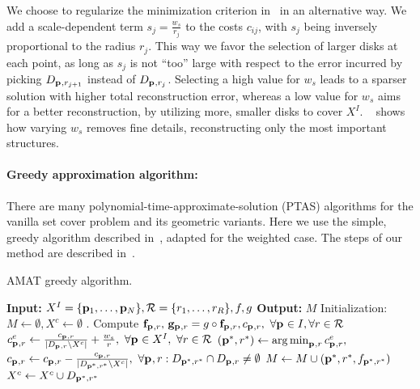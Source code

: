 \documentclass[10pt,twocolumn,letterpaper]{article}
\begin{document}
We choose to regularize the minimization criterion in~ in an alternative way. 
We add a scale-dependent term $s_j = \frac{w_s}{r_j}$ to the costs $c_{ij}$, with $s_j$ 
being inversely proportional to the radius $r_j$.
This way we favor the selection of larger disks at each point, as long as $s_j$ is not ``too'' large
with respect to the error incurred by picking $D_{\mathbf{p}_{},r_{j+1}}$ instead of $D_{\mathbf{p}_{},r_j}$.
Selecting a high value for $w_s$ leads to a sparser solution with higher total reconstruction error,
whereas a low value for $w_s$ aims for a better reconstruction, by utilizing more, smaller disks
to cover $X^I$.
~ shows how varying $w_s$ removes fine details, reconstructing only the most important structures.

\paragraph{Greedy approximation algorithm:}
There are many polynomial-time-approximate-solution (PTAS) algorithms for the vanilla set cover problem
and its geometric variants.
Here we use the simple, greedy algorithm described in~\cite{vazirani2013approximation}, adapted for the weighted case.
The steps of our method are described in~.
\begin{algorithm}[t]
\caption{AMAT greedy algorithm.}
\label{alg:greedy}
	\begin{algorithmic}[1]
	\Statex \textbf{Input:} $X^I=\{\mathbf{p}_{1},\ldots,\mathbf{p}_{N}\},\mathcal{R}=\{r_1,\ldots,r_R\},f,g$
	\Statex \textbf{Output:} $M$
	\State Initialization: $M \leftarrow \emptyset,X^c \leftarrow \emptyset$ .
	\State Compute $\mathbf{f}_{\mathbf{p}_{},r},\, \mathbf{g}_{\mathbf{p}_{},r} = g \circ \mathbf{f}_{\mathbf{p}_{},r},c_{\mathbf{p}_{},r},\  \forall \mathbf{p}_{} \in I, \forall r \in \mathcal{R}$
		\State $c_{\mathbf{p}_{},r}^e \leftarrow \frac{c_{\mathbf{p}_{},r}}{|D_{\mathbf{p}_{},r} \setminus X^c|}+\frac{w_s}{r},\ \forall \mathbf{p}_{} \in X^I,\ \forall r \in \mathcal{R}$
		\State $(\mathbf{p}_{}^{*},r^{*}) \leftarrow \operatorname*{arg\,min}_{\mathbf{p}_{},r}{c_{\mathbf{p}_{},r}^e},$		
		\State $c_{\mathbf{p}_{},r} \leftarrow c_{\mathbf{p}_{},r} - \frac{c_{\mathbf{p}_{},r}}{|D_{\mathbf{p}_{}^{*},r^{*}} \setminus X^c|},$
		\Statex\hspace{\algorithmicindent}\hspace{\algorithmicindent}
			$\forall \mathbf{p}_{},r: D_{\mathbf{p}_{}^{*},r^{*}} \cap D_{\mathbf{p}_{},r} \neq \emptyset$
		\State $M\leftarrow M\cup{(\mathbf{p}_{}^{*},r^{*},f_{\mathbf{p}_{}^{*},r^{*}})}$
		\State $X^c \leftarrow X^c \cup D_{\mathbf{p}_{}^{*},r^{*}}$ 
	\EndWhile
	\end{algorithmic}
\end{algorithm}
\end{document}
